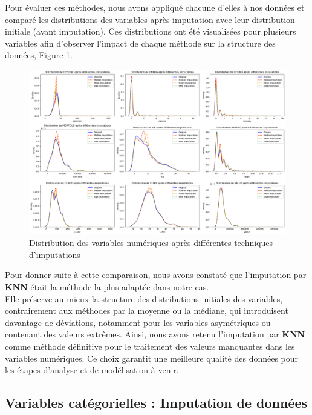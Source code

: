 \documentclass[a4paper,12pt]{report}
\begin{document}
\bigbreak

Pour évaluer ces méthodes, nous avons appliqué chacune d'elles à nos données et comparé les distributions des variables après imputation avec leur distribution initiale (avant imputation).
Ces distributions ont été visualisées pour plusieurs variables afin d’observer l’impact de chaque méthode sur la structure des données, Figure \ref{fig:plot_num_imputation_distrib}.

\begin{figure}[h!]
  \includegraphics[width=\textwidth]{../images/plot_num_imputation_distrib}
  \caption{Distribution des variables numériques après différentes techniques d'imputations}
  \label{fig:plot_num_imputation_distrib}
\end{figure}

\pagebreak

Pour donner suite à cette comparaison, nous avons constaté que l’imputation par \textbf{KNN} était la méthode la plus adaptée dans notre cas.\\
Elle préserve au mieux la structure des distributions initiales des variables, contrairement aux méthodes par la moyenne ou la médiane, qui introduisent davantage de déviations, notamment pour les variables asymétriques ou contenant des valeurs extrêmes.
Ainsi, nous avons retenu l’imputation par \textbf{KNN} comme méthode définitive pour le traitement des valeurs manquantes dans les variables numériques. Ce choix garantit une meilleure qualité des données pour les étapes d’analyse et de modélisation à venir.

\subsection{Variables catégorielles : Imputation de données}
\end{document}
